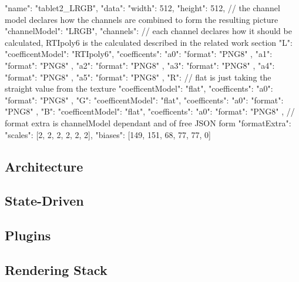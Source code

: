 \begin{json}
{
  "name": "tablet2_LRGB",
  "data": {
    "width": 512,
    "height": 512,
    // the channel model declares how the channels are combined to form the
    resulting picture
    "channelModel": "LRGB",
    "channels": {
      // each channel declares how it should be calculated, RTIpoly6 is the calculated described in the related work section
      "L": {
        "coefficentModel": "RTIpoly6",
        "coefficents": {
          "a0": { "format": "PNG8" },
          "a1": { "format": "PNG8" },
          "a2": { "format": "PNG8" },
          "a3": { "format": "PNG8" },
          "a4": { "format": "PNG8" },
          "a5": { "format": "PNG8" }
        }
      },
      "R": {
        // flat is just taking the straight value from the texture
        "coefficentModel": "flat",
        "coefficents": {
          "a0": { "format": "PNG8" }
        }
      },
      "G": {
        "coefficentModel": "flat",
        "coefficents": {
          "a0": { "format": "PNG8" }
        }
      },
      "B": {
        "coefficentModel": "flat",
        "coefficents": {
          "a0": { "format": "PNG8"}
        }
      }
    },
    // format extra is channelModel dependant and of free JSON form
    "formatExtra": {
      "scales": [2, 2, 2, 2, 2, 2],
      "biases": [149, 151, 68, 77, 77, 0]
    }
  }
}
\end{json}


\subsection{Architecture}

\subsection{State-Driven}
\subsection{Plugins}
\subsection{Rendering Stack}


